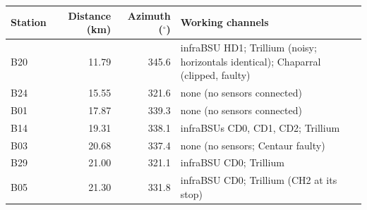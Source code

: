 \begin{tabular}{lrrp{}}
\toprule
Station & Distance (km) & Azimuth ($^{\circ}$) & Working channels \\
\midrule
B20 & 11.79 & 345.6 & infraBSU HD1; Trillium (noisy; horizontals identical); Chaparral (clipped, faulty) \\
B24 & 15.55 & 321.6 & none (no sensors connected) \\
B01 & 17.87 & 339.3 & none (no sensors connected) \\
B14 & 19.31 & 338.1 & infraBSUs CD0, CD1, CD2; Trillium \\
B03 & 20.68 & 337.4 & none (no sensors; Centaur faulty) \\
B29 & 21.00 & 321.1 & infraBSU CD0; Trillium \\
B05 & 21.30 & 331.8 & infraBSU CD0; Trillium (CH2 at its stop) \\
\bottomrule
\end{tabular}
